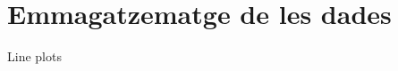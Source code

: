\section{Emmagatzematge de les dades}\label{sec:data-storing}

\begin{frame}{Line plots}
    \begin{figure}
        \label{fig:figure}
    \end{figure}
\end{frame}